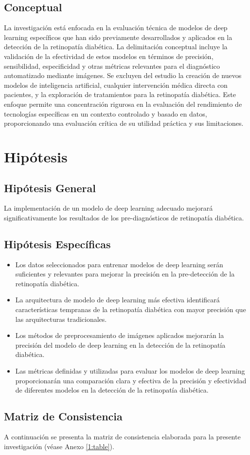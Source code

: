 \subsection{Conceptual}
La investigación está enfocada en la evaluación técnica de modelos de deep learning específicos que han sido previamente desarrollados y aplicados en la detección de la retinopatía diabética. La delimitación conceptual incluye la validación de la efectividad de estos modelos en términos de precisión, sensibilidad, especificidad y otras métricas relevantes para el diagnóstico automatizado mediante imágenes. Se excluyen del estudio la creación de nuevos modelos de inteligencia artificial, cualquier intervención médica directa con pacientes, y la exploración de tratamientos para la retinopatía diabética. Este enfoque permite una concentración rigurosa en la evaluación del rendimiento de tecnologías específicas en un contexto controlado y basado en datos, proporcionando una evaluación crítica de su utilidad práctica y sus limitaciones.


\section{Hipótesis}

\subsection{Hipótesis General}
\newcommand{\HipotesisGeneral}{
	La implementación de un modelo de deep learning adecuado mejorará significativamente los resultados de los pre-diagnósticos de retinopatía diabética.
}
\HipotesisGeneral

\subsection{Hipótesis Específicas}
\newcommand{\Hone}{
	Los datos seleccionados para entrenar modelos de deep learning serán suficientes y relevantes para mejorar la precisión en la pre-detección de la retinopatía diabética.
}
\newcommand{\Htwo}{
	La arquitectura de modelo de deep learning más efectiva identificará características tempranas de la retinopatía diabética con mayor precisión que las arquitecturas tradicionales.
}
\newcommand{\Hthree}{
	Los métodos de preprocesamiento de imágenes aplicados mejorarán la precisión del modelo de deep learning en la detección de la retinopatía diabética.
}
\newcommand{\Hfour}{
	Las métricas definidas y utilizadas para evaluar los modelos de deep learning proporcionarán una comparación clara y efectiva de la precisión y efectividad de diferentes modelos en la detección de la retinopatía diabética.
}
\newcommand{\Hfive}{
	xws
}

\begin{itemize}
	\item \Hone
	\item \Htwo
	\item \Hthree
	 \item \Hfour
\end{itemize}

\subsection{Matriz de Consistencia}
A continuación se presenta la matriz de consistencia elaborada para la presente investigación (véase Anexo \ref{1:table}).
